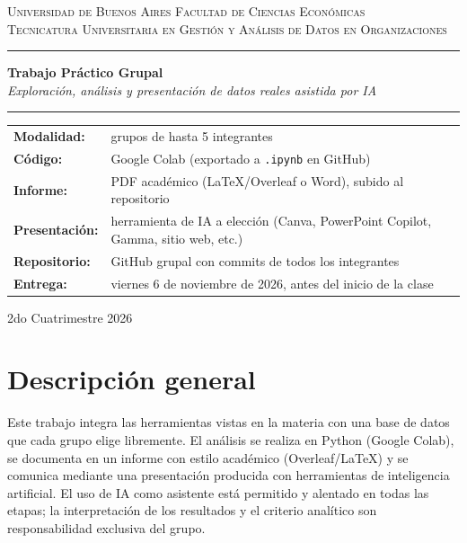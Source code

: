 \documentclass[11pt,a4paper]{article}
\newcommand{\Cuatrimestre}{2do Cuatrimestre 2026}
\newcommand{\FechaEntrega}{viernes 6 de noviembre de 2026, antes del inicio de la clase}
\begin{document}
\thispagestyle{plain}

\begin{center}
  {\scshape Universidad de Buenos Aires \textperiodcentered{} Facultad de Ciencias Económicas}\\[2pt]
  {\scshape Tecnicatura Universitaria en Gestión y Análisis de Datos en Organizaciones}

  \vspace{1.2em}\rule{\linewidth}{0.8pt}\vspace{0.6em}

  {\LARGE\bfseries Trabajo Práctico Grupal}\\[4pt]
  {\itshape Exploración, análisis y presentación de datos reales asistida por IA}

  \vspace{0.6em}\rule{\linewidth}{0.8pt}
\end{center}

\vspace{0.6em}
\begin{tabularx}{\linewidth}{@{}>{\bfseries}l X@{}}
Modalidad:    & grupos de hasta 5 integrantes \\
Código:       & Google Colab (exportado a \texttt{.ipynb} en GitHub) \\
Informe:      & PDF académico (\LaTeX/Overleaf o Word), subido al repositorio \\
Presentación: & herramienta de IA a elección (Canva, PowerPoint Copilot, Gamma, sitio web, etc.) \\
Repositorio:  & GitHub grupal con commits de todos los integrantes \\
Entrega:      & \FechaEntrega \\
\end{tabularx}

\begin{center}\small \Cuatrimestre\end{center}

\section*{Descripción general}
Este trabajo integra las herramientas vistas en la materia con una base de datos que cada grupo
elige libremente. El análisis se realiza en Python (Google Colab), se documenta en un informe
con estilo académico (Overleaf/\LaTeX) y se comunica mediante una presentación producida con
herramientas de inteligencia artificial. El uso de IA como asistente está permitido y alentado en
todas las etapas; la interpretación de los resultados y el criterio analítico son responsabilidad
exclusiva del grupo.
\end{document}
